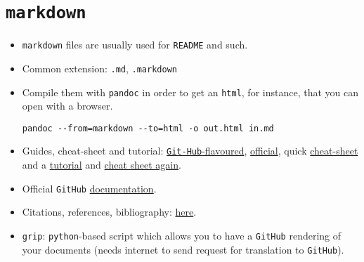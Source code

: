 \documentclass[a4paper,12pt,%
              final%
              ]{article}
\begin{document}
\section{\texttt{markdown}}
\label{sec:markdown}
\begin{itemize}
  \item \texttt{markdown} files are usually used for \texttt{README} and such.
  \item Common extension: \texttt{.md}, \texttt{.markdown}
  \item Compile them with \texttt{pandoc} in order to get an \texttt{html}, for instance, that you can open with a browser.
\begin{verbatim}
pandoc --from=markdown --to=html -o out.html in.md
\end{verbatim}
  \item Guides, cheat-sheet and tutorial:
    \href{https://github.com/adam-p/markdown-here/wiki/Markdown-Cheatsheet}{\texttt{Git-Hub}-flavoured},
    \href{https://daringfireball.net/projects/markdown/syntax}{official}, quick
    \href{https://commonmark.org/help/}{cheat-sheet} and a
    \href{https://agea.github.io/tutorial.md/}{tutorial} and
    \href{https://enterprise.github.com/downloads/en/markdown-cheatsheet.pdf}{cheat sheet again}.
  \item Official \texttt{GitHub} \href{https://docs.github.com/en/github/writing-on-github/basic-writing-and-formatting-syntax}{documentation}.
  \item Citations, references, bibliography: \href{https://stackoverflow.com/questions/26587527/cite-a-paper-using-github-markdown-syntax}{here}.
  \item \texttt{grip}: \texttt{python}-based script which allows you to have a \texttt{GitHub} rendering of your documents (needs internet to send request for translation to \texttt{GitHub}).
\end{itemize}

\end{document}
